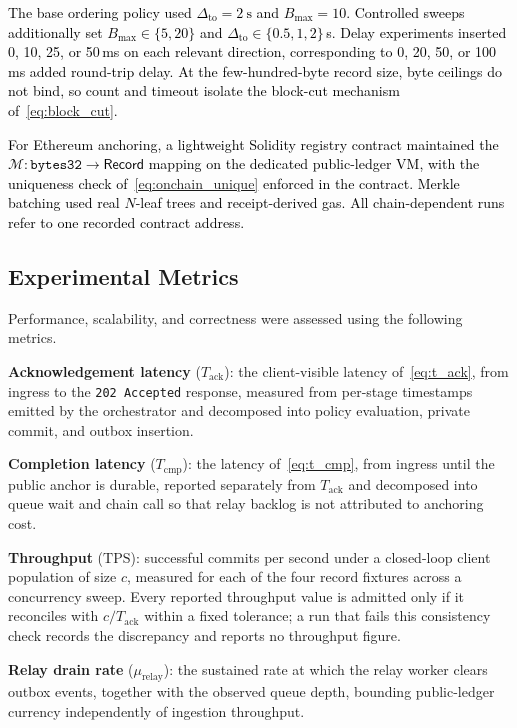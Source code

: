 \documentclass[final,5p,times,twocolumn]{elsarticle}
\begin{document}
\textcolor{black}{The base ordering policy used $\Delta_{\mathrm{to}}=\SI{2}{\second}$ and $B_{\max}=10$. Controlled sweeps additionally set $B_{\max}\in\{5,20\}$ and $\Delta_{\mathrm{to}}\in\{0.5,1,2\}$\,s. Delay experiments inserted 0, 10, 25, or 50\,ms on each relevant direction, corresponding to 0, 20, 50, or 100\,ms added round-trip delay. At the few-hundred-byte record size, byte ceilings do not bind, so count and timeout isolate the block-cut mechanism of~\eqref{eq:block_cut}.}

\textcolor{black}{For Ethereum anchoring, a lightweight Solidity registry contract maintained the $\mathcal{M}:\texttt{bytes32}\!\rightarrow\!\textsf{Record}$ mapping on the dedicated public-ledger VM, with the uniqueness check of~\eqref{eq:onchain_unique} enforced in the contract. Merkle batching used real $N$-leaf trees and receipt-derived gas. All chain-dependent runs refer to one recorded contract address.}

\subsection{\textbf{Experimental Metrics}}
Performance, scalability, and correctness were assessed using the following metrics.

\textbf{Acknowledgement latency} ($T_{\mathrm{ack}}$): the client-visible latency of~\eqref{eq:t_ack}, from ingress to the \texttt{202~Accepted} response, measured from per-stage timestamps emitted by the orchestrator and decomposed into policy evaluation, private commit, and outbox insertion.

\textbf{Completion latency} ($T_{\mathrm{cmp}}$): the latency of~\eqref{eq:t_cmp}, from ingress until the public anchor is durable, reported separately from $T_{\mathrm{ack}}$ and decomposed into queue wait and chain call so that relay backlog is not attributed to anchoring cost.

\textbf{Throughput} ($\mathrm{TPS}$): successful commits per second under a closed-loop client population of size $c$, measured for each of the four record fixtures across a concurrency sweep. Every reported throughput value is admitted only if it reconciles with $c/T_{\mathrm{ack}}$ within a fixed tolerance; a run that fails this consistency check records the discrepancy and reports no throughput figure.

\textbf{Relay drain rate} ($\mu_{\mathrm{relay}}$): the sustained rate at which the relay worker clears outbox events, together with the observed queue depth, bounding public-ledger currency independently of ingestion throughput.
\end{document}
